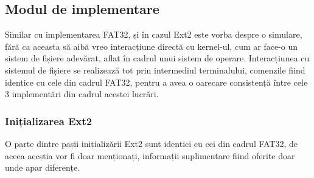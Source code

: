 \bigskip


\subsection{Modul de implementare}

Similar cu implementarea FAT32, și în cazul Ext2 este vorba despre o simulare, fără ca aceasta să aibă vreo interacțiune directă cu kernel-ul, cum ar face-o un sistem de fișiere adevărat, aflat în cadrul unui sistem de operare. Interacțiunea cu sistemul de fișiere se realizează tot prin intermediul terminalului, comenzile fiind identice cu cele din cadrul FAT32, pentru a avea o oarecare consistență între cele 3 implementări din cadrul acestei lucrări.

\subsubsection{Inițializarea Ext2}

O parte dintre pașii inițializării Ext2 sunt identici cu cei din cadrul FAT32, de aceea aceștia vor fi doar menționați, informații suplimentare fiind oferite doar unde apar diferențe.

